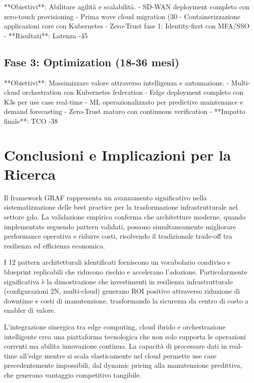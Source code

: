 **Obiettivi**: Abilitare agilità e scalabilità.
- SD-WAN deployment completo con zero-touch provisioning
- Prima wave cloud migration (30%
- Containerizzazione applicazioni core con Kubernetes
- Zero-Trust fase 1: Identity-first con MFA/SSO
- **Risultati**: Latenza -45%

\subsection{\texorpdfstring{Fase 3: Optimization (18-36 mesi)}{3.7.3 - Fase 3: Optimization (18-36 mesi)}}

**Obiettivi**: Massimizzare valore attraverso intelligenza e automazione.
- Multi-cloud orchestration con Kubernetes federation
- Edge deployment completo con K3s per use case real-time
- ML operazionalizzato per predictive maintenance e demand forecasting
- Zero-Trust maturo con continuous verification
- **Impatto finale**: TCO -38%

\section{\texorpdfstring{Conclusioni e Implicazioni per la Ricerca}{3.8 - Conclusioni e Implicazioni per la Ricerca}}
\label{sec:cap3_conclusioni}

Il framework GRAF rappresenta un avanzamento significativo nella sistematizzazione delle best practice per la trasformazione infrastrutturale nel settore \gls{gdo}. La validazione empirica conferma che architetture moderne, quando implementate seguendo pattern validati, possono simultaneamente migliorare performance operativa e ridurre costi, risolvendo il tradizionale trade-off tra resilienza ed efficienza economica.

I 12 pattern architetturali identificati forniscono un vocabolario condiviso e blueprint replicabili che riducono rischio e accelerano l'adozione. Particolarmente significativa è la dimostrazione che investimenti in resilienza infrastrutturale (configurazioni 2N, multi-cloud) generano ROI positivo attraverso riduzione di downtime e costi di manutenzione, trasformando la sicurezza da centro di costo a enabler di valore.

L'integrazione sinergica tra edge computing, cloud ibrido e orchestrazione intelligente crea una piattaforma tecnologica che non solo supporta le operazioni correnti ma abilita innovazione continua. La capacità di processare dati in real-time all'edge mentre si scala elasticamente nel cloud permette use case precedentemente impossibili, dal dynamic pricing alla manutenzione predittiva, che generano vantaggio competitivo tangibile.

